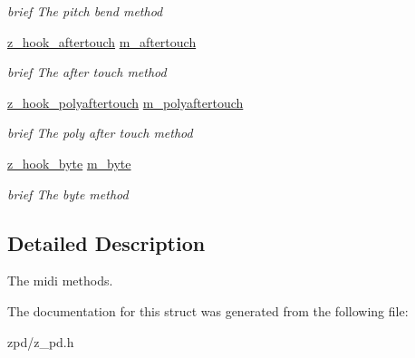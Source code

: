 \begin{DoxyCompactItemize}
\begin{DoxyCompactList}\small\item\em brief The pitch bend method \end{DoxyCompactList}\item 
\hypertarget{struct__hook__midi_ad94cb41b5b9d085b28d285cfb9527cc3}{\hyperlink{group__zpd_gadc1545aa2d7f2ea07b430b9298ec2f9d}{z\-\_\-hook\-\_\-aftertouch} \hyperlink{struct__hook__midi_ad94cb41b5b9d085b28d285cfb9527cc3}{m\-\_\-aftertouch}}\label{struct__hook__midi_ad94cb41b5b9d085b28d285cfb9527cc3}

\begin{DoxyCompactList}\small\item\em brief The after touch method \end{DoxyCompactList}\item 
\hypertarget{struct__hook__midi_a84b5c3f8dedd566f27fc4c813befce28}{\hyperlink{group__zpd_ga35708c361dc10084ffeff19333bed883}{z\-\_\-hook\-\_\-polyaftertouch} \hyperlink{struct__hook__midi_a84b5c3f8dedd566f27fc4c813befce28}{m\-\_\-polyaftertouch}}\label{struct__hook__midi_a84b5c3f8dedd566f27fc4c813befce28}

\begin{DoxyCompactList}\small\item\em brief The poly after touch method \end{DoxyCompactList}\item 
\hypertarget{struct__hook__midi_ae07b6744194c8ff6e8bec4f9bf3a1df6}{\hyperlink{group__zpd_ga678844ef26377b42232a67a8ef560819}{z\-\_\-hook\-\_\-byte} \hyperlink{struct__hook__midi_ae07b6744194c8ff6e8bec4f9bf3a1df6}{m\-\_\-byte}}\label{struct__hook__midi_ae07b6744194c8ff6e8bec4f9bf3a1df6}

\begin{DoxyCompactList}\small\item\em brief The byte method \end{DoxyCompactList}\end{DoxyCompactItemize}


\subsection{Detailed Description}
The midi methods. 

The documentation for this struct was generated from the following file\-:\begin{DoxyCompactItemize}
\item 
zpd/z\-\_\-pd.\-h\end{DoxyCompactItemize}
